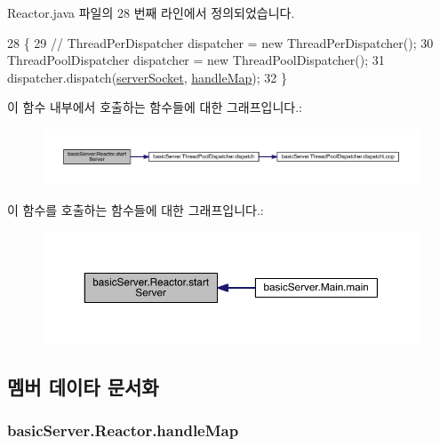 Reactor.\+java 파일의 28 번째 라인에서 정의되었습니다.


\begin{DoxyCode}
28                               \{
29         \textcolor{comment}{// ThreadPerDispatcher dispatcher = new ThreadPerDispatcher();}
30         ThreadPoolDispatcher dispatcher = \textcolor{keyword}{new} ThreadPoolDispatcher();
31         dispatcher.dispatch(\hyperlink{classbasic_server_1_1_reactor_a2ddae2bb37e01fa74cfdd54b02ad00d0}{serverSocket}, \hyperlink{classbasic_server_1_1_reactor_a74841c32eee00227bbd43e8d016aad20}{handleMap});
32     \}
\end{DoxyCode}


이 함수 내부에서 호출하는 함수들에 대한 그래프입니다.\+:\nopagebreak
\begin{figure}[H]
\begin{center}
\leavevmode
\includegraphics[width=350pt]{classbasic_server_1_1_reactor_aaa28ae533a17acacc0acb5a7161c84e5_cgraph}
\end{center}
\end{figure}




이 함수를 호출하는 함수들에 대한 그래프입니다.\+:\nopagebreak
\begin{figure}[H]
\begin{center}
\leavevmode
\includegraphics[width=350pt]{classbasic_server_1_1_reactor_aaa28ae533a17acacc0acb5a7161c84e5_icgraph}
\end{center}
\end{figure}




\subsection{멤버 데이타 문서화}
\hypertarget{classbasic_server_1_1_reactor_a74841c32eee00227bbd43e8d016aad20}{
\subsubsection[{handle\+Map}]{ basic\+Server.\+Reactor.\+handle\+Map\hspace{0.3cm}{\ttfamily [private]}}}\label{classbasic_server_1_1_reactor_a74841c32eee00227bbd43e8d016aad20}


